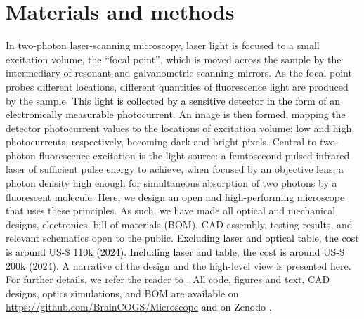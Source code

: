 \documentclass[10pt,letterpaper]{article}
\begin{document}
\section*{Materials and methods}
In two-photon laser-scanning microscopy\cite{Denk1990}, laser light is focused to a small excitation volume,  the ``focal point'', which is moved across the sample by the intermediary of resonant and galvanometric scanning mirrors. As the focal point probes different locations, different quantities of fluorescence light are produced by the sample. \textcolor{black}{This light is collected by a sensitive detector in the form of an electronically measurable photocurrent.} An image is then formed, mapping the detector photocurrent values to the locations of excitation volume: low and high photocurrents, respectively, becoming dark and bright pixels. Central to two-photon fluorescence excitation is the light source: a femtosecond-pulsed infrared laser of sufficient pulse energy to achieve, when focused by an objective lens, a photon density high enough for simultaneous absorption of two photons by a fluorescent molecule. Here, we design an open and high-performing microscope that uses these principles. As such, we have made all optical and mechanical designs, electronics, bill of materials (BOM), CAD assembly, testing results, and relevant schematics open to the public. \textcolor{black}{Excluding laser and optical table, the cost is around US-\$ 110k (2024). Including laser and table, the cost is around US-\$ 200k (2024).} A narrative of the design and the high-level view is presented here. For further details, we refer the reader to . All code, figures and text, CAD designs, optics simulations, and BOM are available on  \url{https://github.com/BrainCOGS/Microscope} \textcolor{black}{and on Zenodo \cite{Zenodo2024}.}
\end{document}
